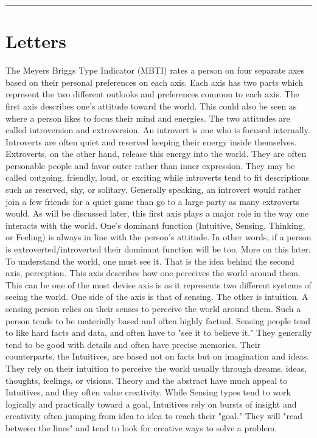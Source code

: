 \noindent\rule{\linewidth}{1pt}

\section{Letters}

The Meyers Briggs Type Indicator (MBTI) rates a person on four separate axes based on their personal preferences on each axis. Each axis has two parts which represent the two different outlooks and preferences common to each axis. 
The first axis describes one's attitude toward the world. This could also be seen as where a person likes to focus their mind and energies. The two attitudes are called introversion and extroversion. An introvert is one who is focused internally. Introverts are often quiet and reserved keeping their energy inside themselves. Extroverts, on the other hand, release this energy into the world.  They are often personable people and favor outer rather than inner expression. They may be called outgoing, friendly, loud, or exciting while introverts tend to fit descriptions such as reserved, shy, or solitary. Generally speaking, an introvert would rather join a few friends for a quiet game than go to a large party as many extroverts would. As will be discussed later, this first axis plays a major role in the way one interacts with the world. One's dominant function (Intuitive, Sensing, Thinking, or Feeling) is always in line with the person's attitude. In other words, if a person is extroverted/introverted their dominant function will be too. More on this later.
To understand the world, one must see it. That is the idea behind the second axis, perception. This axis describes how one perceives the world around them. This can be one of the most devise axis is as it represents two different systems of seeing the world. One side of the axis is that of sensing. The other is intuition. A sensing person relies on their senses to perceive the world around them. Such a person tends to be materially based and often highly factual. Sensing people tend to like hard facts and data, and often have to "see it to believe it." They generally tend to be good with details and often have precise memories. Their counterparts, the Intuitives, are based not on facts but on imagination and ideas. They rely on their intuition to perceive the world usually through dreams, ideas, thoughts, feelings, or visions. Theory and the abstract have much appeal to Intuitives, and they often value creativity. While Sensing types tend to work logically and practically toward a goal, Intuitives rely on bursts of insight and creativity often jumping from idea to idea to reach their "goal." They will "read between the lines" and tend to look for creative ways to solve a problem.
